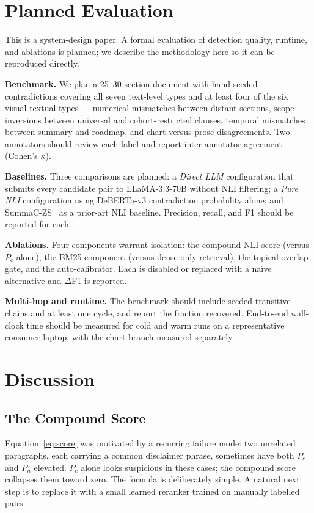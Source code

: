 \documentclass[conference]{IEEEtran}
\begin{document}
\section{Planned Evaluation}\label{sec:eval}
This is a system-design paper. A formal evaluation of detection quality, runtime, and ablations is planned; we describe the methodology here so it can be reproduced directly.

\textbf{Benchmark.} We plan a 25--30-section document with hand-seeded contradictions covering all seven text-level types and at least four of the six visual-textual types --- numerical mismatches between distant sections, scope inversions between universal and cohort-restricted clauses, temporal mismatches between summary and roadmap, and chart-versus-prose disagreements. Two annotators should review each label and report inter-annotator agreement (Cohen's $\kappa$).

\textbf{Baselines.} Three comparisons are planned: a \emph{Direct LLM} configuration that submits every candidate pair to LLaMA-3.3-70B without NLI filtering; a \emph{Pure NLI} configuration using DeBERTa-v3 contradiction probability alone; and SummaC-ZS~\cite{b1} as a prior-art NLI baseline. Precision, recall, and F1 should be reported for each.

\textbf{Ablations.} Four components warrant isolation: the compound NLI score (versus $P_c$ alone), the BM25 component (versus dense-only retrieval), the topical-overlap gate, and the auto-calibrator. Each is disabled or replaced with a na\"{i}ve alternative and $\Delta$F1 is reported.

\textbf{Multi-hop and runtime.} The benchmark should include seeded transitive chains and at least one cycle, and report the fraction recovered. End-to-end wall-clock time should be measured for cold and warm runs on a representative consumer laptop, with the chart branch measured separately.

\section{Discussion}\label{sec:discussion}
\subsection{The Compound Score}
Equation~\ref{eq:score} was motivated by a recurring failure mode: two unrelated paragraphs, each carrying a common disclaimer phrase, sometimes have both $P_c$ and $P_n$ elevated. $P_c$ alone looks suspicious in these cases; the compound score collapses them toward zero. The formula is deliberately simple. A natural next step is to replace it with a small learned reranker trained on manually labelled pairs.
\end{document}

